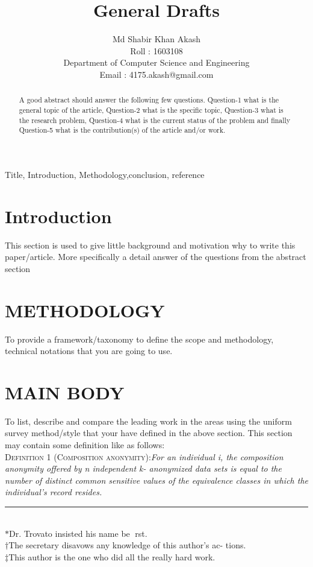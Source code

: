 \documentclass[preprint,11pt]{elsarticle}
\begin{document}
	
	\begin{frontmatter}
		\title{General Drafts}
		\author{Md Shabir Khan Akash\\Roll : 1603108\\Department of Computer Science and Engineering\\Email : 4175.akash@gmail.com
		}
		\begin{abstract}
			A good abstract should answer the following few
			questions. Question-1 what is the general topic of the article,
			Question-2 what is the specific topic, Question-3 what is the
			research problem, Question-4 what is the current status of the
			problem and finally Question-5 what is the contribution(s) of the
			article and/or work.
		\end{abstract}
		
		\begin{keyword}
			Title, Introduction, Methodology,conclusion, reference
		\end{keyword}
		
	\end{frontmatter}
	
	
	\section{Introduction}
	\label{sec:introduction}
	This section is used to give little background and motivation
	why to write this paper/article. More specifically a detail
	answer of the questions from the abstract section
	\section{METHODOLOGY}
	To provide a framework/taxonomy to define the scope and
	methodology, technical notations that you are going to use.
	
	\section{MAIN BODY}
	To list, describe and compare the leading work in the areas
	using the uniform survey method/style that your have defined
	in the above section. This section may contain some definition
	like as follows:\\
	\textsc{Definition 1 (Composition anonymity):}\textit{For an individual i,
		the composition anonymity offered by n independent k-
		anonymized data sets is equal to the number of distinct
		common sensitive values of the equivalence classes in which
		the individual’s record resides.}\\
	\noindent\rule{4cm}{0.4pt}\\
	$\ast$Dr. Trovato insisted his name be rst.\\
	$\dagger$The secretary disavows any knowledge of this author's ac-
	tions.\\
	$\ddagger$This author is the one who did all the really hard work.
\end{document}
